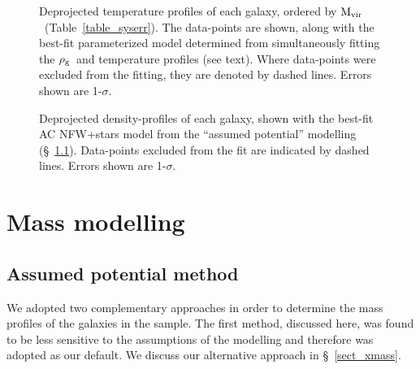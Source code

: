 \documentclass{emulateapj}
\newcommand{\rhog}{${\rm \rho_g}$}
\newcommand{\mvir}{${\rm M_{vir}}$}
\begin{document}
\begin{figure}
\centering
\caption{Deprojected temperature profiles of each galaxy, ordered by 
\mvir\ (Table~\ref{table_syserr}). The data-points are shown, along
with the best-fit parameterized model determined from simultaneously fitting
the \rhog\ and temperature profiles (see text). Where data-points were excluded
from the fitting, they are denoted by dashed lines. Errors shown are 1-$\sigma$.}
\label{fig_temp}
\end{figure}


\begin{figure}
\centering
\caption{Deprojected density-profiles of each galaxy, shown with the best-fit
AC NFW+stars model from the ``assumed potential'' modelling (\S~\ref{sect_potential}).
Data-points excluded from the fit are indicated by dashed lines. 
Errors shown are 1-$\sigma$.}
\label{fig_density}
\end{figure}
\section{Mass modelling} \label{sect_mass}

\subsection{Assumed potential method} \label{sect_potential}
We adopted two complementary approaches in order to determine the 
mass profiles of the galaxies
in the sample. The first method, discussed here, was found to be 
less sensitive to the assumptions of the modelling and therefore was
adopted as our default. We discuss our alternative approach in
 \S~\ref{sect_xmass}. 
\end{document}
